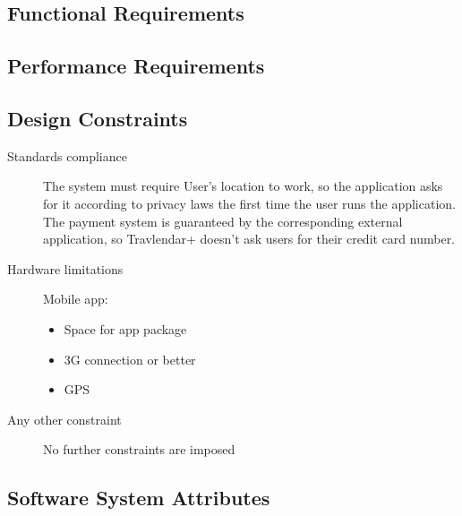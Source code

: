 \subsection{Functional Requirements}
	
			
\subsection{Performance Requirements}
		
		
\subsection{Design Constraints}
		\begin{description}
			\item[Standards compliance]
			The system must require User’s location to work, so the application asks for it according to privacy laws the first time the user runs the application.
			The payment system is guaranteed by the corresponding external application, so Travlendar+ doesn’t ask users for their credit card number.

			\item[Hardware limitations]
			Mobile app:
			\begin{itemize}
			\item Space for app package
			\item 3G connection or better
			\item GPS
		\end{itemize}

			\item[Any other constraint]
			No further constraints are imposed
\end{description}
		
\subsection{Software System Attributes}
	
